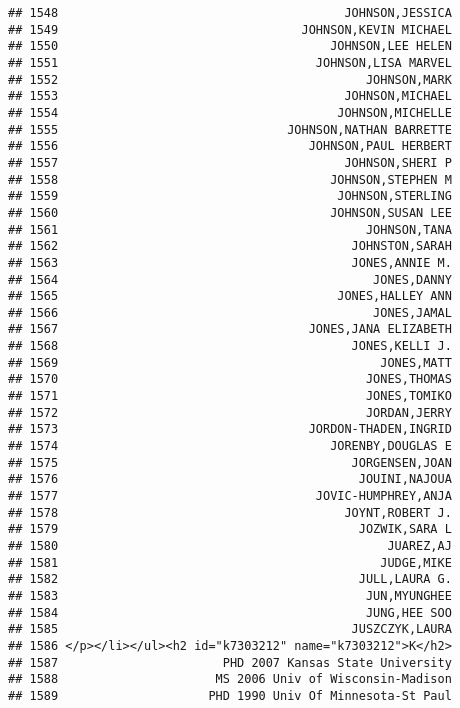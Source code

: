 \documentclass[
]{article}
\begin{document}
\begin{verbatim}
## 1548                                        JOHNSON,JESSICA
## 1549                                  JOHNSON,KEVIN MICHAEL
## 1550                                      JOHNSON,LEE HELEN
## 1551                                    JOHNSON,LISA MARVEL
## 1552                                           JOHNSON,MARK
## 1553                                        JOHNSON,MICHAEL
## 1554                                       JOHNSON,MICHELLE
## 1555                                JOHNSON,NATHAN BARRETTE
## 1556                                   JOHNSON,PAUL HERBERT
## 1557                                        JOHNSON,SHERI P
## 1558                                      JOHNSON,STEPHEN M
## 1559                                       JOHNSON,STERLING
## 1560                                      JOHNSON,SUSAN LEE
## 1561                                           JOHNSON,TANA
## 1562                                         JOHNSTON,SARAH
## 1563                                         JONES,ANNIE M.
## 1564                                            JONES,DANNY
## 1565                                       JONES,HALLEY ANN
## 1566                                            JONES,JAMAL
## 1567                                   JONES,JANA ELIZABETH
## 1568                                         JONES,KELLI J.
## 1569                                             JONES,MATT
## 1570                                           JONES,THOMAS
## 1571                                           JONES,TOMIKO
## 1572                                           JORDAN,JERRY
## 1573                                   JORDON-THADEN,INGRID
## 1574                                      JORENBY,DOUGLAS E
## 1575                                         JORGENSEN,JOAN
## 1576                                          JOUINI,NAJOUA
## 1577                                    JOVIC-HUMPHREY,ANJA
## 1578                                        JOYNT,ROBERT J.
## 1579                                          JOZWIK,SARA L
## 1580                                              JUAREZ,AJ
## 1581                                             JUDGE,MIKE
## 1582                                          JULL,LAURA G.
## 1583                                           JUN,MYUNGHEE
## 1584                                           JUNG,HEE SOO
## 1585                                         JUSZCZYK,LAURA
## 1586 </p></li></ul><h2 id="k7303212" name="k7303212">K</h2>
## 1587                       PHD 2007 Kansas State University
## 1588                      MS 2006 Univ of Wisconsin-Madison
## 1589                     PHD 1990 Univ Of Minnesota-St Paul

\end{verbatim}
\end{document}
